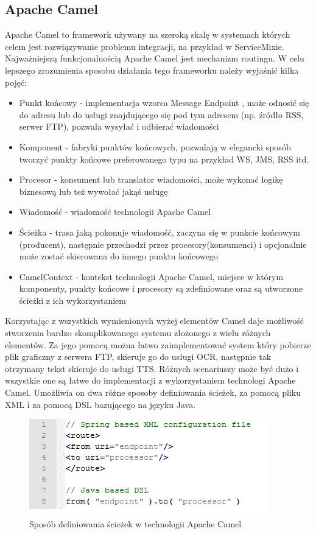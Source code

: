 \subsection{Apache Camel}
Apache Camel \cite{camel2012} \cite{ibsen2010} to framework używany na szeroką skalę w systemach których celem jest rozwiązywanie problemu integracji, na przykład w ServiceMixie. Najważniejszą funkcjonalnością Apache Camel jest mechanizm routingu. W celu lepszego zrozumienia sposobu działania tego frameworku należy wyjaśnić kilka pojęć:
\begin{itemize}
	\item Punkt końcowy - implementacja wzorca Message Endpoint \cite{hohpe2003}, może odnosić się do adresu lub do usługi znajdującego się pod tym adresem (np. źródło RSS, serwer FTP), pozwala wysyłać i odbierać wiadomości  
	\item Komponent - fabryki punktów końcowych, pozwalają w elegancki sposób tworzyć punkty końcowe preferowanego typu na przykład WS, JMS, RSS itd.
	\item Procesor - konsument lub translator wiadomości, może wykonać logikę biznesową lub też wywołać jakąś usługę
	\item Wiadomość - wiadomość technologii Apache Camel
	\item Ścieżka - trasa jaką pokonuje wiadomość, zaczyna się w punkcie końcowym (producent), następnie przechodzi przez procesory(konsumenci) i opcjonalnie może zostać skierowana do innego punktu końcowego
	\item CamelContext - kontekst technologii Apache Camel, miejsce w którym komponenty, punkty końcowe i procesory są zdefiniowane oraz są utworzone ścieżki z ich wykorzystaniem
\end{itemize}  
Korzystając z wszystkich wymienionych wyżej elementów Camel daje możliwość stworzenia bardzo skomplikowanego systemu złożonego z wielu różnych elementów. Za jego pomocą można łatwo zaimplementować system który pobierze plik graficzny z serwera FTP, skieruje go do usługi OCR, następnie tak otrzymany tekst skieruje do usługi TTS. Różnych scenariuszy może być dużo i wszystkie one są łatwe do implementacji z wykorzystaniem technologi Apache Camel. Umożliwia on dwa różne sposoby definiowania ścieżek, za pomocą pliku XML i za pomocą DSL bazującego na języku Java.
\begin{figure}[!h]
	\centering
	\includegraphics[scale=0.95]{camel.png} 
	\caption{Sposób definiowania ścieżek w technologii Apache Camel}
\end{figure}
	
